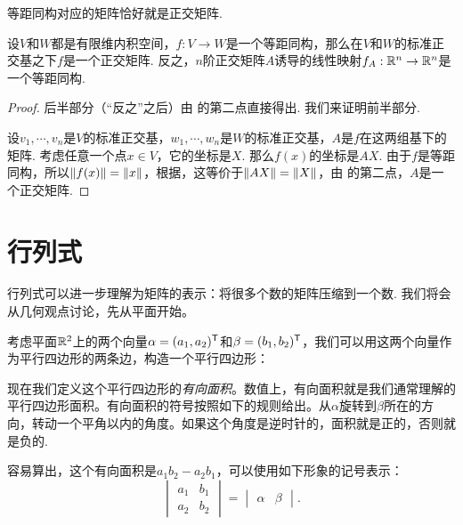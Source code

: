 等距同构对应的矩阵恰好就是正交矩阵. 
\begin{proposition}\label{prop:isometry-matrix}
设$V$和$W$都是有限维内积空间，$f:V\to W$是一个等距同构，那么在$V$和$W$的标准正交基之下$f$是一个正交矩阵. 反之，$n$阶正交矩阵$A$诱导的线性映射$f_A:\mathbb{R}^n\to\mathbb{R}^n$是一个等距同构. 
\end{proposition}
\begin{proof}
    后半部分（“反之”之后）由 的第二点直接得出. 我们来证明前半部分. 
    
    设$v_1,\cdots,v_n$是$V$的标准正交基，$w_1,\cdots,w_n$是$W$的标准正交基，$A$是$f$在这两组基下的矩阵. 考虑任意一个点$x\in V$，它的坐标是$X$. 那么$f(x)$的坐标是$AX$. 由于$f$是等距同构，所以$\left\|f(x)\right\|=\left\|x\right\|$，根据，这等价于$\left\|AX\right\|=\left\|X\right\|$，由 的第二点，$A$是一个正交矩阵. 
\end{proof}

\section{行列式}\label{sec:determinant}

行列式可以进一步理解为矩阵的表示：将很多个数的矩阵压缩到一个数. 我们将会从几何观点讨论，先从平面开始。 

考虑平面$\mathbb{R}^2$上的两个向量$\alpha=(a_1,a_2)^{\mathsf{T}}$和$\beta=(b_1,b_2)^{\mathsf{T}}$，我们可以用这两个向量作为平行四边形的两条边，构造一个平行四边形：
\begin{center}
\end{center}

现在我们定义这个平行四边形的\emph{有向面积}。数值上，有向面积就是我们通常理解的平行四边形面积。有向面积的符号按照如下的规则给出。从$\alpha$旋转到$\beta$所在的方向，转动一个平角以内的角度。如果这个角度是逆时针的，面积就是正的，否则就是负的. 

容易算出，这个有向面积是$a_1b_2-a_2b_1$，可以使用如下形象的记号表示：
\[\begin{vmatrix}
    a_1 & b_1 \\
    a_2 & b_2
\end{vmatrix}=
\begin{vmatrix}
    \alpha & \beta
\end{vmatrix}.\]


